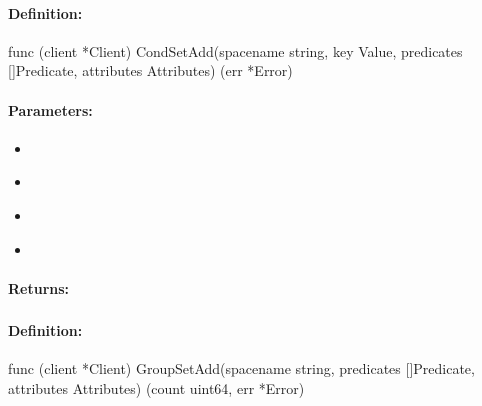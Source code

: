 \paragraph{Definition:}
\begin{gocode}
func (client *Client) CondSetAdd(spacename string, key Value, predicates []Predicate, attributes Attributes) (err *Error)
\end{gocode}

\paragraph{Parameters:}
\begin{itemize}[noitemsep]
\item {}\\

\item {}\\

\item {}\\

\item {}\\

\end{itemize}

\paragraph{Returns:}


\pagebreak
\subsubsection{}
\label{api:Go:GroupSetAdd}


\paragraph{Definition:}
\begin{gocode}
func (client *Client) GroupSetAdd(spacename string, predicates []Predicate, attributes Attributes) (count uint64, err *Error)
\end{gocode}


